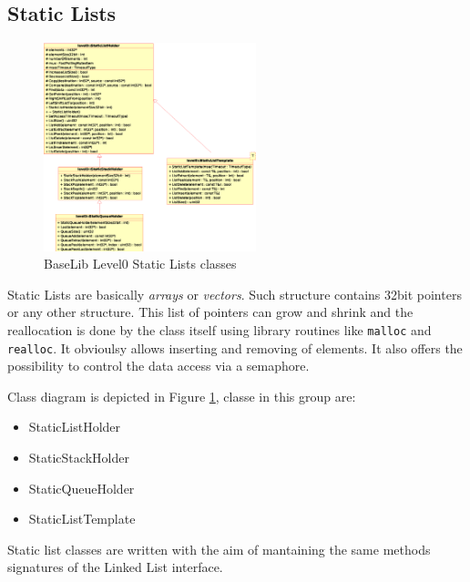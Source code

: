 \subsection{Static Lists}
\begin{figure}[h!]
 \begin{center}
  \includegraphics[width=0.55\textwidth]{level0/level0-static.eps}
  \caption{BaseLib Level0 Static Lists classes}
  \label{f:level0:static}
 \end{center}
\end{figure}

Static Lists are basically \textit{arrays} or \textit{vectors}. Such structure contains 32bit pointers or any other structure. This list of pointers can grow and shrink and the reallocation is done by the class itself using library routines like \texttt{malloc} and \texttt{realloc}. It obvioulsy allows inserting and removing of elements. It also offers the possibility to control the data access via a semaphore.


Class diagram is depicted in Figure \ref{f:level0:static}, classe in this group are:

\begin{itemize}
 \item StaticListHolder
 \item StaticStackHolder
 \item StaticQueueHolder

 \item StaticListTemplate
\end{itemize}

Static list classes are written with the aim of mantaining the same methods signatures of the Linked List interface.



